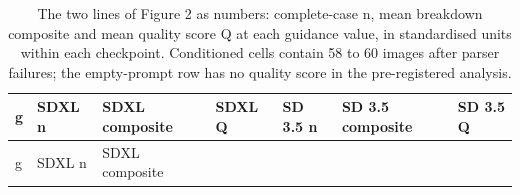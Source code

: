 \documentclass[11pt]{article}
\begin{document}
\begin{longtable}[]{@{}
  >{\raggedright\arraybackslash}p{}
  >{\raggedright\arraybackslash}p{}
  >{\raggedright\arraybackslash}p{}
  >{\raggedright\arraybackslash}p{}
  >{\raggedright\arraybackslash}p{}
  >{\raggedright\arraybackslash}p{}
  >{\raggedright\arraybackslash}p{}@{}}
\caption{The two lines of Figure 2 as numbers: complete-case n, mean breakdown
composite and mean quality score Q at each guidance value, in standardised units
within each checkpoint. Conditioned cells contain 58 to 60 images after parser
failures; the empty-prompt row has no quality score in the pre-registered
analysis.}\tabularnewline
\toprule\noalign{}
\begin{minipage}[b]{\linewidth}\raggedright
g
\end{minipage} & \begin{minipage}[b]{\linewidth}\raggedright
SDXL n
\end{minipage} & \begin{minipage}[b]{\linewidth}\raggedright
SDXL composite
\end{minipage} & \begin{minipage}[b]{\linewidth}\raggedright
SDXL Q
\end{minipage} & \begin{minipage}[b]{\linewidth}\raggedright
SD 3.5 n
\end{minipage} & \begin{minipage}[b]{\linewidth}\raggedright
SD 3.5 composite
\end{minipage} & \begin{minipage}[b]{\linewidth}\raggedright
SD 3.5 Q
\end{minipage} \\
\midrule\noalign{}
\endfirsthead
\toprule\noalign{}
\begin{minipage}[b]{\linewidth}\raggedright
g
\end{minipage} & \begin{minipage}[b]{\linewidth}\raggedright
SDXL n
\end{minipage} & \begin{minipage}[b]{\linewidth}\raggedright
SDXL composite
\end{minipage} & \begin{minipage}[b]{\linewidth}\raggedright

\end{minipage}
\end{longtable}
\end{document}
